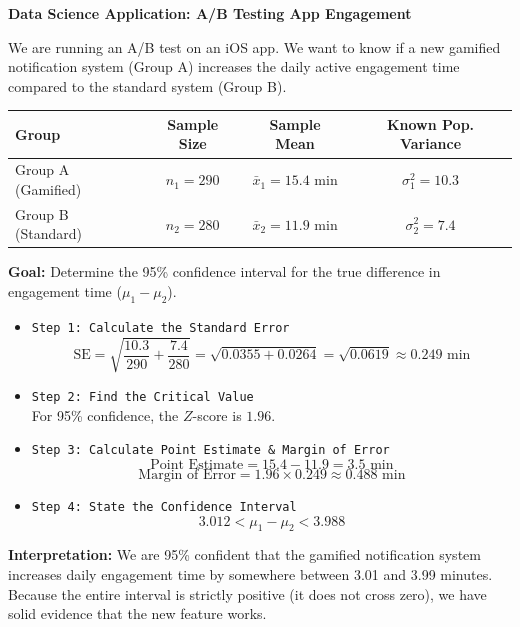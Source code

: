 \vspace{0.2cm}
\begin{example}{\textbf{Data Science Application: A/B Testing App Engagement}}

We are running an A/B test on an iOS app. We want to know if a new gamified notification system (Group A) increases the daily active engagement time compared to the standard system (Group B).

\begin{center}
\renewcommand{\arraystretch}{1.2}
\begin{tabular}{|l|c|c|c|}
\hline
\textbf{Group} & \textbf{Sample Size} & \textbf{Sample Mean} & \textbf{Known Pop. Variance} \\
\hline
Group A (Gamified) & $n_1 = 290$ & $\bar{x}_1 = 15.4$ min & $\sigma_1^2 = 10.3$ \\
Group B (Standard) & $n_2 = 280$ & $\bar{x}_2 = 11.9$ min & $\sigma_2^2 = 7.4$ \\
\hline
\end{tabular}
\end{center}

\textbf{Goal:} Determine the 95\% confidence interval for the true difference in engagement time ($\mu_1 - \mu_2$).

\begin{itemize}
    \item \texttt{Step 1: Calculate the Standard Error}
    \[
    \text{SE} = \sqrt{\frac{10.3}{290} + \frac{7.4}{280}} = \sqrt{0.0355 + 0.0264} = \sqrt{0.0619} \approx 0.249 \text{ min}
    \]
    
    \item \texttt{Step 2: Find the Critical Value} \\
    For 95\% confidence, the $Z$-score is $1.96$.
    
    \item \texttt{Step 3: Calculate Point Estimate \& Margin of Error}
    \[
    \text{Point Estimate} = 15.4 - 11.9 = 3.5 \text{ min}
    \]
    \[
    \text{Margin of Error} = 1.96 \times 0.249 \approx 0.488 \text{ min}
    \]
    
    \item \texttt{Step 4: State the Confidence Interval}
    \[
    \boxed{3.012 < \mu_1 - \mu_2 < 3.988}
    \]
\end{itemize}
\textbf{Interpretation:} We are 95\% confident that the gamified notification system increases daily engagement time by somewhere between 3.01 and 3.99 minutes. Because the entire interval is strictly positive (it does not cross zero), we have solid evidence that the new feature works.
\end{example}

